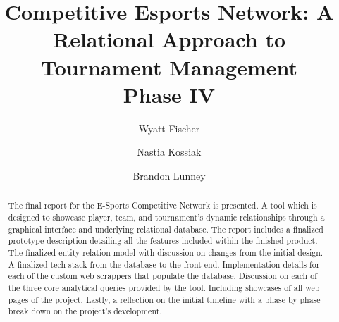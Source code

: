 \documentclass[sigconf]{acmart}
\begin{document}
\title{Competitive Esports Network: A Relational Approach to
Tournament Management \\ Phase IV}

\author{Wyatt Fischer}

\author{Nastia Kossiak}
\author{Brandon Lunney}

\renewcommand{\shortauthors}{Fischer, Kossiak, and Lunney}

\begin{abstract}
The final report for the E-Sports Competitive Network is presented. A tool which is designed to showcase player, team, and tournament's dynamic relationships through a graphical interface and underlying relational database. The report includes a finalized prototype description detailing all the features included within the finished product. The finalized entity relation model with discussion on changes from the initial design. A finalized tech stack from the database to the front end. Implementation details for each of the custom web scrappers that populate the database. Discussion on each of the three core analytical queries provided by the tool. Including showcases of all web pages of the project. Lastly, a reflection on the initial timeline with a phase by phase break down on the project's development. 
\end{abstract}
\end{document}
